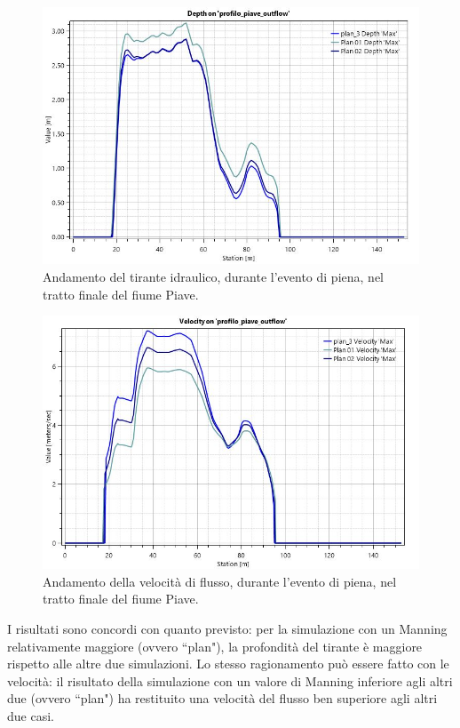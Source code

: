 \begin{figure}[htb] \centering
    \includegraphics[scale=0.5]{immagini/depth_piave_outflow.JPG}
    \caption{Andamento del tirante idraulico, durante l'evento di piena, nel tratto finale del fiume Piave.}
    \label{figure:depth_piave_outflow}
\end{figure}

\begin{figure}[htb] \centering
    \includegraphics[scale=0.5]{immagini/velocity_piave_outflow.JPG}
    \caption{Andamento della velocità di flusso, durante l'evento di piena, nel tratto finale del fiume Piave.}
    \label{figure:velocity_piave_outflow}
\end{figure}

I risultati sono concordi con quanto previsto: per la simulazione con un Manning relativamente maggiore (ovvero ``plan"), la profondità del tirante è maggiore rispetto alle altre due simulazioni. Lo stesso ragionamento può essere fatto con le velocità: il risultato della simulazione con un valore di Manning inferiore agli altri due (ovvero ``plan") ha restituito una velocità del flusso ben superiore agli altri due casi.

